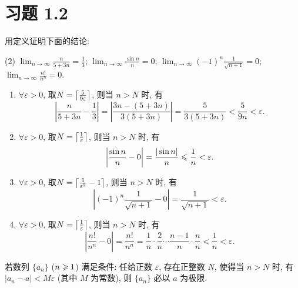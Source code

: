 \section{习题 1.2}

\begin{exercise}[1.2.1]
    用定义证明下面的结论:
    \begin{tasks}[label=(\arabic*)](2)
        \task $\lim_{n\to\infty} \frac{n}{5+3n} = \frac{1}{3}$;
        \task $\lim_{n\to\infty} \frac{\sin n}{n} = 0$;
        \task $\lim_{n\to\infty} (-1)^n \frac{1}{\sqrt{n+1}} = 0$;
        \task $\lim_{n\to\infty} \frac{n!}{n^n} = 0$.
    \end{tasks}
\end{exercise}

\begin{solution}
    \begin{enumerate}[(1)]
        \item $\forall \varepsilon > 0$, 取$N = \llceil \frac{5}{9\varepsilon} \rrceil$, 则当 $n > N$ 时, 有
              $$
                  \left| \frac{n}{5 + 3n} - \frac{1}{3} \right| = \left| \frac{3n - (5 + 3n)}{3(5 + 3n)} \right| = \frac{5}{3(5 + 3n)} < \frac{5}{9n} < \varepsilon.
              $$
        \item $\forall \varepsilon > 0$, 取$N = \llceil \frac{1}{\varepsilon} \rrceil$, 则当 $n > N$ 时, 有
              $$
                  \left| \frac{\sin n}{n} - 0 \right| = \frac{|\sin n|}{n} \les \frac{1}{n} < \varepsilon.
              $$
        \item $\forall \varepsilon > 0$, 取$N = \llceil \frac{1}{\varepsilon^2} - 1 \rrceil$, 则当 $n > N$ 时, 有
              $$
                  \left| (-1)^n \frac{1}{\sqrt{n + 1}} - 0 \right| = \frac{1}{\sqrt{n + 1}} < \varepsilon.
              $$
        \item $\forall \varepsilon > 0$, 取$N = \llceil \frac{1}{\varepsilon} \rrceil$, 则当 $n > N$ 时, 有
              $$
                  \left| \frac{n!}{n^n} - 0 \right| = \frac{n!}{n^n} = \frac{1}{n} \cdot \frac{2}{n} \cdots \frac{n - 1}{n} \cdot \frac{n}{n} < \frac{1}{n} < \varepsilon.
              $$
    \end{enumerate}
\end{solution}

\begin{exercise}[1.2.2]
    若数列 $\{a_n\}$ ($n \ges 1$) 满足条件: 任给正数 $\varepsilon$, 存在正整数 $N$, 使得当 $n > N$ 时, 有 $|a_n - a| < M\varepsilon$ (其中 $M$ 为常数), 则 $\{a_n\}$ 必以 $a$ 为极限.
\end{exercise}

